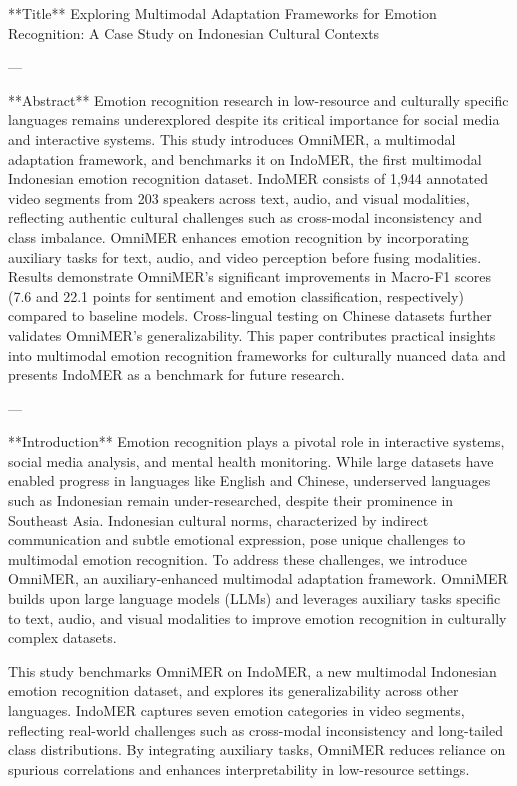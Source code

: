 **Title**  
Exploring Multimodal Adaptation Frameworks for Emotion Recognition: A Case Study on Indonesian Cultural Contexts  

---

**Abstract**  
Emotion recognition research in low-resource and culturally specific languages remains underexplored despite its critical importance for social media and interactive systems. This study introduces OmniMER, a multimodal adaptation framework, and benchmarks it on IndoMER, the first multimodal Indonesian emotion recognition dataset. IndoMER consists of 1,944 annotated video segments from 203 speakers across text, audio, and visual modalities, reflecting authentic cultural challenges such as cross-modal inconsistency and class imbalance. OmniMER enhances emotion recognition by incorporating auxiliary tasks for text, audio, and video perception before fusing modalities. Results demonstrate OmniMER’s significant improvements in Macro-F1 scores (7.6 and 22.1 points for sentiment and emotion classification, respectively) compared to baseline models. Cross-lingual testing on Chinese datasets further validates OmniMER’s generalizability. This paper contributes practical insights into multimodal emotion recognition frameworks for culturally nuanced data and presents IndoMER as a benchmark for future research.  

---

**Introduction**  
Emotion recognition plays a pivotal role in interactive systems, social media analysis, and mental health monitoring. While large datasets have enabled progress in languages like English and Chinese, underserved languages such as Indonesian remain under-researched, despite their prominence in Southeast Asia. Indonesian cultural norms, characterized by indirect communication and subtle emotional expression, pose unique challenges to multimodal emotion recognition. To address these challenges, we introduce OmniMER, an auxiliary-enhanced multimodal adaptation framework. OmniMER builds upon large language models (LLMs) and leverages auxiliary tasks specific to text, audio, and visual modalities to improve emotion recognition in culturally complex datasets.  

This study benchmarks OmniMER on IndoMER, a new multimodal Indonesian emotion recognition dataset, and explores its generalizability across other languages. IndoMER captures seven emotion categories in video segments, reflecting real-world challenges such as cross-modal inconsistency and long-tailed class distributions. By integrating auxiliary tasks, OmniMER reduces reliance on spurious correlations and enhances interpretability in low-resource settings.  

